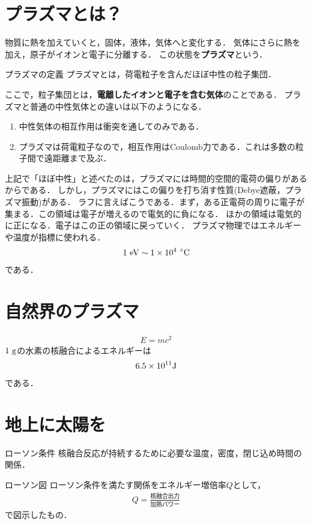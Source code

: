 \documentclass{report}
\begin{document}
  \section{プラズマとは？}
    物質に熱を加えていくと，固体，液体，気体へと変化する．
    気体にさらに熱を加え，原子がイオンと電子に分離する．
    この状態を\textbf{プラズマ}という．
    \begin{itembox}[l]{プラズマの定義}
      プラズマとは，荷電粒子を含んだほぼ中性の粒子集団．
    \end{itembox}
    ここで，粒子集団とは，\textbf{電離したイオンと電子を含む気体}のことである．
    プラズマと普通の中性気体との違いは以下のようになる．
    \begin{enumerate}
      \item 中性気体の相互作用は衝突を通してのみである．
      \item プラズマは荷電粒子なので，相互作用はCoulomb力である．これは多数の粒子間で遠距離まで及ぶ．
    \end{enumerate}
    上記で「ほぼ中性」と述べたのは，プラズマには時間的空間的電荷の偏りがあるからである．
    しかし，プラズマにはこの偏りを打ち消す性質(Debye遮蔽，プラズマ振動)がある．
    ラフに言えばこうである．まず，ある正電荷の周りに電子が集まる．この領域は電子が増えるので電気的に負になる．
    ほかの領域は電気的に正になる．電子はこの正の領域に戻っていく．
    プラズマ物理ではエネルギーや温度が指標に使われる．
    \begin{align}
      1\ \r{eV} \sim 1 \times 10^4\ \si{\degreeCelsius}
    \end{align}
    である．
  \section{自然界のプラズマ}
    \begin{align}
      E = mc^2
    \end{align}
    $1\ \mathrm{g}$の水素の核融合によるエネルギーは
    \begin{align}
      6.5 \times 10^{11} \mathrm{J}
    \end{align}
    である．
  \section{地上に太陽を}
    \begin{itembox}[l]{ローソン条件}
      核融合反応が持続するために必要な温度，密度，閉じ込め時間の関係．  
    \end{itembox}
    \begin{itembox}[l]{ローソン図}
      ローソン条件を満たす関係をエネルギー増倍率$Q$として，
      \begin{align}
        Q = \frac{\text{核融合出力}}{\text{加熱パワー}}
      \end{align}
      で図示したもの．
    \end{itembox}
\end{document}
